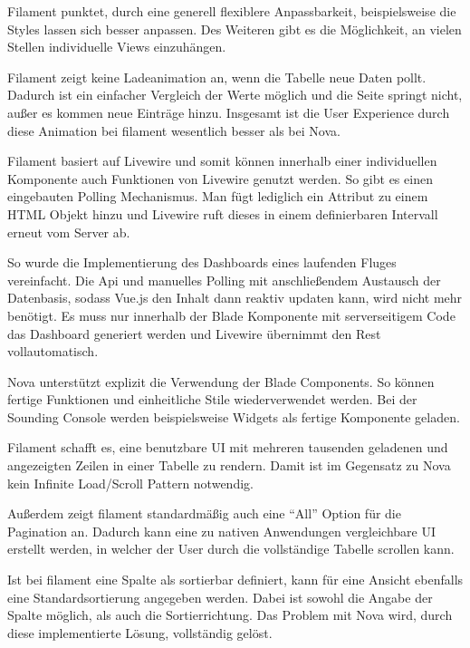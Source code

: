 \newpage

Filament punktet, durch eine generell flexiblere Anpassbarkeit, beispielsweise die Styles lassen sich besser anpassen.
Des Weiteren gibt es die Möglichkeit, an vielen Stellen individuelle Views einzuhängen.

Filament zeigt keine Ladeanimation an, wenn die Tabelle neue Daten pollt.
Dadurch ist ein einfacher Vergleich der Werte möglich und die Seite springt nicht, außer es kommen neue Einträge hinzu.
Insgesamt ist die User Experience durch diese Animation bei filament wesentlich besser als bei Nova.

Filament basiert auf Livewire\cite{livewire} und somit können innerhalb einer individuellen Komponente auch Funktionen von Livewire genutzt werden.
So gibt es einen eingebauten Polling Mechanismus.
Man fügt lediglich ein Attribut zu einem HTML Objekt hinzu und Livewire ruft dieses in einem definierbaren Intervall erneut vom Server ab.

So wurde die Implementierung des Dashboards eines laufenden Fluges vereinfacht.
Die Api und manuelles Polling mit anschließendem Austausch der Datenbasis, sodass Vue.js den Inhalt dann reaktiv updaten kann, wird nicht mehr benötigt.
Es muss nur innerhalb der Blade Komponente mit serverseitigem Code das Dashboard generiert werden und Livewire übernimmt den Rest vollautomatisch.

\newpage

Nova unterstützt explizit die Verwendung der Blade Components.
So können fertige Funktionen und einheitliche Stile wiederverwendet werden.
Bei der Sounding Console werden beispielsweise Widgets als fertige Komponente geladen.

Filament schafft es, eine benutzbare UI mit mehreren tausenden geladenen und angezeigten Zeilen in einer Tabelle zu rendern.
Damit ist im Gegensatz zu Nova kein Infinite Load/Scroll Pattern notwendig.

Außerdem zeigt filament standardmäßig auch eine \enquote{All} Option für die Pagination an.
Dadurch kann eine zu nativen Anwendungen vergleichbare UI erstellt werden, in welcher der User durch die vollständige Tabelle scrollen kann.

Ist bei filament eine Spalte als sortierbar definiert, kann für eine Ansicht ebenfalls eine Standardsortierung angegeben werden.
Dabei ist sowohl die Angabe der Spalte möglich, als auch die Sortierrichtung.
Das Problem mit Nova wird, durch diese implementierte Lösung, vollständig gelöst.

